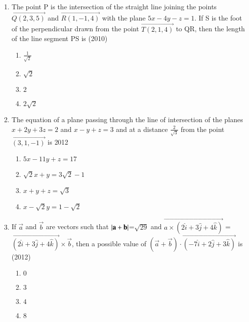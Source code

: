 \documentclass[journal,12pt,twocolumn]{IEEEtran}
\theoremstyle{remark}
\begin{document}
\begin{enumerate}
	 \item %
		 The point P is the intersection of the straight line joining the points $\vec{Q(2,3,5)}$ and $\vec{R(1,-1,4)}$ with the plane $5x-4y-z=1$. If S is the foot of the perpendicular drawn from the point $\vec{T(2,1,4)}$ to QR, then the length of the line segment PS is \hfill{(2010)}\\
\begin{enumerate}
	\item $\frac{1}{\sqrt{2}}$           
	\item $\sqrt{2}$                   
        \item $2$           
	\item $2\sqrt{2}$\\ 
\end{enumerate}
\newpage
         \item %
		 The equation of a plane passing through the line of intersection of the planes $x+2y+3z=2$ and $x-y+z=3$ and at a distance $\frac{2}{\sqrt{3}}$ from the point $\vec{(3,1,-1)}$ is \hfill{2012}\\
\begin{enumerate}
        \item $5x-11y+z=17$           
	\item $\sqrt{2}x+y=3\sqrt{2}-1$                   
	\item $x+y+z=\sqrt{3}$           
	\item $x-\sqrt{2}y=1-\sqrt{2}$\\ 
\end{enumerate}

         \item %
		 If $\vec{a}$ and $\vec{b}$ are vectors such that $\left\vert\mathbf{a}+\mathbf{b}\right\vert$=$\sqrt{29}$ and $\vec{a\times(2\hat{i}+3\hat{j}+4\hat{k})}$ = $\vec{(2\hat{i}+3\hat{j}+4\hat{k})}\times\vec{b}$, then a possible value of $(\vec{a}+\vec{b})\cdot\vec{(-7\hat{i}+2\hat{j}+3\hat{k})}$ is \hfill{(2012)}\\
\begin{enumerate}
        \item $0$                             
        \item $3$                           
        \item $4$            
        \item $8$\\          
\end{enumerate}


\end{enumerate}
\end{document}
